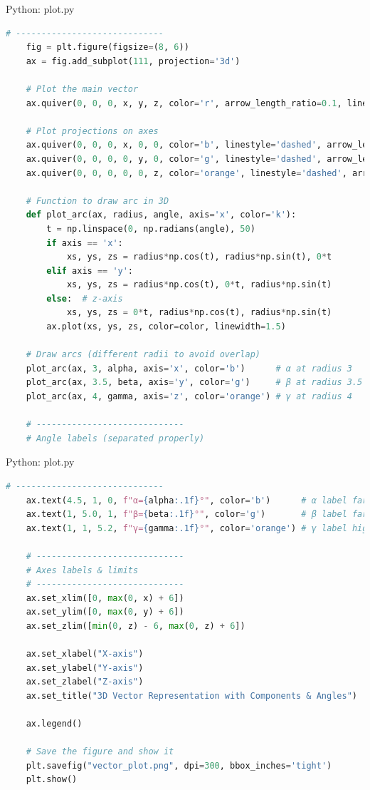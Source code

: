 \documentclass{beamer}
\numberwithin{equation}{section}
\theoremstyle{remark}
\begin{document}
\begin{frame}[fragile]{Python: plot.py}
\begin{lstlisting}[language=Python]
    # -----------------------------
    fig = plt.figure(figsize=(8, 6))
    ax = fig.add_subplot(111, projection='3d')

    # Plot the main vector
    ax.quiver(0, 0, 0, x, y, z, color='r', arrow_length_ratio=0.1, linewidth=2, label="Vector r")

    # Plot projections on axes
    ax.quiver(0, 0, 0, x, 0, 0, color='b', linestyle='dashed', arrow_length_ratio=0.05, label="x-component")
    ax.quiver(0, 0, 0, 0, y, 0, color='g', linestyle='dashed', arrow_length_ratio=0.05, label="y-component")
    ax.quiver(0, 0, 0, 0, 0, z, color='orange', linestyle='dashed', arrow_length_ratio=0.05, label="z-component")

    # Function to draw arc in 3D
    def plot_arc(ax, radius, angle, axis='x', color='k'):
        t = np.linspace(0, np.radians(angle), 50)
        if axis == 'x':
            xs, ys, zs = radius*np.cos(t), radius*np.sin(t), 0*t
        elif axis == 'y':
            xs, ys, zs = radius*np.cos(t), 0*t, radius*np.sin(t)
        else:  # z-axis
            xs, ys, zs = 0*t, radius*np.cos(t), radius*np.sin(t)
        ax.plot(xs, ys, zs, color=color, linewidth=1.5)

    # Draw arcs (different radii to avoid overlap)
    plot_arc(ax, 3, alpha, axis='x', color='b')      # α at radius 3
    plot_arc(ax, 3.5, beta, axis='y', color='g')     # β at radius 3.5
    plot_arc(ax, 4, gamma, axis='z', color='orange') # γ at radius 4

    # -----------------------------
    # Angle labels (separated properly)
\end{lstlisting}
\end{frame}

\begin{frame}[fragile]{Python: plot.py}
\begin{lstlisting}[language=Python]
    # -----------------------------
    ax.text(4.5, 1, 0, f"α={alpha:.1f}°", color='b')      # α label far on +x
    ax.text(1, 5.0, 1, f"β={beta:.1f}°", color='g')       # β label farther on +y
    ax.text(1, 1, 5.2, f"γ={gamma:.1f}°", color='orange') # γ label higher on +z

    # -----------------------------
    # Axes labels & limits
    # -----------------------------
    ax.set_xlim([0, max(0, x) + 6])
    ax.set_ylim([0, max(0, y) + 6])
    ax.set_zlim([min(0, z) - 6, max(0, z) + 6])

    ax.set_xlabel("X-axis")
    ax.set_ylabel("Y-axis")
    ax.set_zlabel("Z-axis")
    ax.set_title("3D Vector Representation with Components & Angles")

    ax.legend()

    # Save the figure and show it
    plt.savefig("vector_plot.png", dpi=300, bbox_inches='tight')
    plt.show()
\end{lstlisting}
\end{frame}
\end{document}
